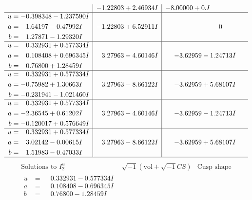 \documentclass[1p]{elsarticle_modified}
\theoremstyle{definition}
\newcommand{\I}{\sqrt{-1}}
\begin{document}
$$\begin{array}{c|c|c}
 & -1.22803 + 2.46934 I & -8.00000 + 0. I\phantom{ +0.000000I} \\ \hline\begin{aligned}
u &= -0.398348 - 1.237590 I \\
a &= \phantom{-}1.64197 - 0.47992 I \\
b &= \phantom{-}1.27871 - 1.29320 I\end{aligned}
 & -1.22803 + 6.52911 I & \phantom{-0.000000 } 0 \\ \hline\begin{aligned}
u &= \phantom{-}0.332931 + 0.577334 I \\
a &= \phantom{-}0.108408 + 0.696345 I \\
b &= \phantom{-}0.76800 + 1.28459 I\end{aligned}
 & \phantom{-}3.27963 - 4.60146 I & -3.62959 - 1.24713 I \\ \hline\begin{aligned}
u &= \phantom{-}0.332931 + 0.577334 I \\
a &= -0.75982 + 1.30663 I \\
b &= -0.231941 - 1.021460 I\end{aligned}
 & \phantom{-}3.27963 - 8.66122 I & -3.62959 + 5.68107 I \\ \hline\begin{aligned}
u &= \phantom{-}0.332931 + 0.577334 I \\
a &= -2.36545 + 0.61202 I \\
b &= -0.120017 + 0.576649 I\end{aligned}
 & \phantom{-}3.27963 - 4.60146 I & -3.62959 - 1.24713 I \\ \hline\begin{aligned}
u &= \phantom{-}0.332931 + 0.577334 I \\
a &= \phantom{-}3.02142 - 0.00615 I \\
b &= \phantom{-}1.51983 - 0.47033 I\end{aligned}
 & \phantom{-}3.27963 - 8.66122 I & -3.62959 + 5.68107 I\\
 \hline 
 \end{array}$$\newpage$$\begin{array}{c|c|c}  
\text{Solutions to }I^u_{2}& \I (\text{vol} + \sqrt{-1}CS) & \text{Cusp shape}\\
 \hline 
\begin{aligned}
u &= \phantom{-}0.332931 - 0.577334 I \\
a &= \phantom{-}0.108408 - 0.696345 I \\
b &= \phantom{-}0.76800 - 1.28459 I\end{aligned}

\end{array}$$
\end{document}
